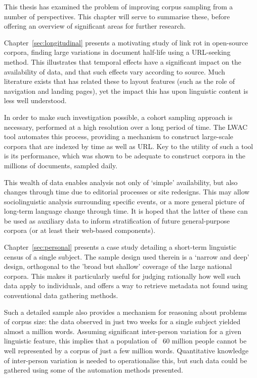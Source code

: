 

This thesis has examined the problem of improving corpus sampling from a number of perspectives.  This chapter will serve to summarise these, before offering an overview of significant areas for further research.

Chapter~\ref{sec:longitudinal} presents a motivating study of link rot in open-source corpora, finding large variations in document half-life using a URL-seeking method.  This illustrates that temporal effects have a significant impact on the availability of data, and that such effects vary according to source.  Much literature exists that has related these to layout features (such as the role of navigation and landing pages), yet the impact this has upon linguistic content is less well understood.

In order to make such investigation possible, a cohort sampling approach is necessary, performed at a high resolution over a long period of time.  The LWAC tool automates this process, providing a mechanism to construct large-scale corpora that are indexed by time as well as URL.  Key to the utility of such a tool is its performance, which was shown to be adequate to construct corpora in the millions of documents, sampled daily.

This wealth of data enables analysis not only of `simple' availability, but also changes through time due to editorial processes or site redesigns.  This may allow sociolinguistic analysis surrounding specific events, or a more general picture of long-term language change through time.  It is hoped that the latter of these can be used as auxiliary data to inform stratification of future general-purpose corpora (or at least their web-based components).

Chapter~\ref{sec:personal} presents a case study detailing a short-term linguistic census of a single subject.  The sample design used therein is a `narrow and deep' design, orthogonal to the 'broad but shallow' coverage of the large national corpora.  This makes it particularly useful for judging rationally how well such data apply to individuals, and offers a way to retrieve metadata not found using conventional data gathering methods.

Such a detailed sample also provides a mechanism for reasoning about problems of corpus size: the data observed in just two weeks for a single subject yielded almost a million words.  Assuming significant inter-person variation for a given linguistic feature, this implies that a population of ~60 million people cannot be well represented by a corpus of just a few million words.  Quantitative knowledge of inter-person variation is needed to operationalise this, but such data could be gathered using some of the automation methods presented.

